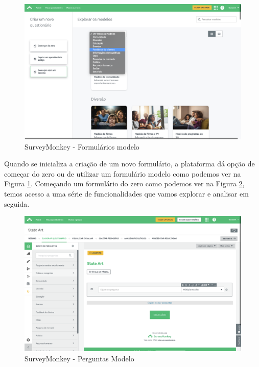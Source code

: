 \newpage

\begin{figure}[ht!]
	\begin{center}
		\includegraphics[width=1\textwidth]{img/survey-form-create}
		\caption{SurveyMonkey - Formulários modelo }
		\label{fig:survey-form-create}
	\end{center}
\end{figure}

Quando se inicializa a criação de um novo formulário, a plataforma dá opção de começar do zero ou de utilizar um formulário modelo como podemos ver na Figura \ref{fig:survey-form-create}. Começando um formulário do zero como podemos ver na Figura \ref{fig:survey-form-banck2}, temos acesso a uma série de funcionalidades que vamos explorar e analisar em seguida.

\begin{figure}[ht!]
	\begin{center}
		\includegraphics[width=1\textwidth]{img/survey-form-bank2}
		\caption{SurveyMonkey -  Perguntas Modelo}
		\label{fig:survey-form-banck2}
	\end{center}
\end{figure}


